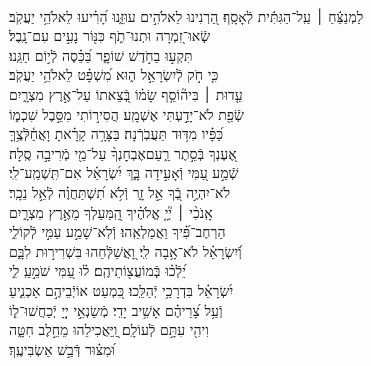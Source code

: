 \documentclass[twoside, openany, parskip=half, 11pt]{book}
\begin{document}
\\
\vspace{-1.5\baselineskip}
\begin{narrow}
%
לַמְנַצֵּ֬חַ ׀ עַֽל־הַגִּתִּ֬ית לְֿאָסָֽף׃ \hfill \break
הַ֭רְנִינוּ לֵאלֹהִ֣ים עוּזֵּ֑נוּ \hfill הָ֝רִ֗יעוּ לֵאלֹהֵ֥י יַעֲקֹֽב׃ \\
שְֽֿׂאוּ־זִ֭מְרָה וּתְנוּ־תֹ֑ף \hfill כִּנּ֖וֹר נָעִ֣ים עִם־נָֽבֶל׃ \\
תִּקְע֣וּ בַחֹ֣דֶשׁ שׁוֹפָ֑ר \hfill בַּ֝כֵּ֗סֶה לְֿי֣וֹם חַגֵּֽנוּ׃ \\
כִּ֤י חֹ֣ק לְֿיִשְׂרָאֵ֣ל ה֑וּא \hfill מִ֝שְׁפָּ֗ט לֵאלֹהֵ֥י יַעֲקֹֽב׃ \\
עֵ֤דוּת ׀ בִּיה֘וֹסֵ֤ף שָׂמ֗וֹ \hfill בְּֿ֭צֵאתוֹ עַל־אֶ֣רֶץ מִצְרָ֑יִם \\ שְֿׂפַ֖ת לֹא־יָדַ֣עְתִּי אֶשְׁמָֽע׃ \hfill
הֲסִיר֣וֹתִי מִסֵּ֣בֶל שִׁכְמ֑וֹ \\ כַּ֝פָּ֗יו מִדּ֥וּד תַּעֲבֹֽרְֿנָה׃ \hfill
בַּצָּרָ֥ה קָרָ֗אתָ וָאֲחַ֫לְּֿצֶ֥ךָּ \\ אֶ֭עֶנְךָ בְּֿסֵ֣תֶר רַ֑עַם\hfill אֶבְחׇנְךָ֨ עַל־מֵ֖י מְֿרִיבָ֣ה סֶֽלָה׃ \\
שְֿׁמַ֣ע עַ֭מִּי וְֿאָעִ֣ידָה בָּ֑ךְ \hfill יִ֝שְׂרָאֵ֗ל אִם־תִּֽשְׁמַֽע־לִֽי׃ \\
לֹא־יִהְיֶ֣ה בְֿ֭ךָ אֵ֣ל זָ֑ר \hfill וְֿלֹ֥א תִ֝שְׁתַּחֲוֶ֗ה לְֿאֵ֣ל נֵכָֽר׃ \\
אָֽנֹכִ֨י ׀ יְ֘יָ֤ אֱלֹהֶ֗יךָ \hfill הַֽ֭מַּעַלְךָ מֵאֶ֣רֶץ מִצְרָ֑יִם \\ הַרְחֶב־פִּ֗֝יךָ וַאֲמַלְאֵֽהוּ׃ \hfill
וְֿלֹֽא־שָׁמַ֣ע עַמִּ֣י לְֿקוֹלִ֑י \\ וְֿ֝יִשְׂרָאֵ֗ל לֹא־אָ֥בָה לִֽי׃ \hfill
וָ֭אֲשַׁלְּֿחֵהוּ בִּשְׁרִיר֣וּת לִבָּ֑ם \\ יֵ֝לְֿכ֗וּ בְּֽֿמוֹעֲצ֖וֹתֵיהֶֽם׃ \hfill
ל֗וּ עַ֭מִּי שֹׁמֵ֣עַֽ לִ֑י \\ יִ֝שְׂרָאֵ֗ל בִּדְרָכַ֥י יְֿהַלֵּֽכוּ׃ \hfill
כִּ֭מְעַט אוֹיְֿבֵיהֶ֣ם אַכְנִ֑יעַ \\ וְֿעַ֥ל צָ֝רֵיהֶ֗ם אָשִׁ֥יב יָדִֽי׃ \hfill
מְֿשַׂנְאֵ֣י יְיָ֭ יְֿכַחֲשׁוּ־ל֑וֹ \\ וִיהִ֖י עִתָּ֣ם לְֿעוֹלָֽם׃ \hfill
וַֽ֭יַּאֲכִילֵהוּ מֵחֵ֣לֶב חִטָּ֑ה \\ וּ֝מִצּ֗וּר דְּֿבַ֣שׁ אַשְׂבִּיעֶֽךָ׃ \hfill \break
\end{narrow}
\end{document}
